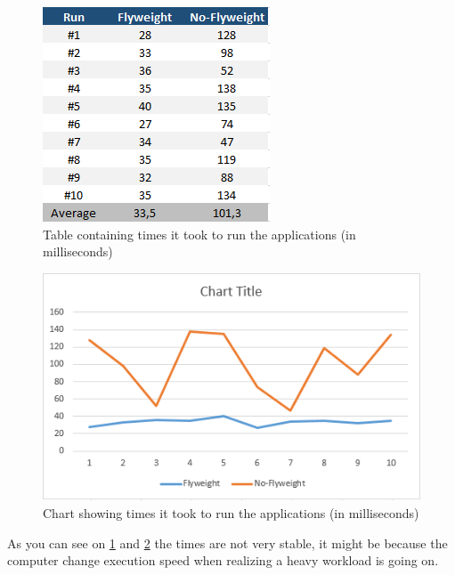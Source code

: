 \begin{figure}[h]
\centering
\includegraphics{Content/TimeTable}
\caption{Table containing times it took to run the applications (in milliseconds)}
\label{fig:TimeTable}
\end{figure}
\begin{figure}[h]
	\centering
	\includegraphics{Content/TimeChart}
	\caption{Chart showing times it took to run the applications (in milliseconds)}
	\label{fig:TimeChart}
\end{figure}
As you can see on \ref{fig:TimeTable} and \ref{fig:TimeChart} the times are not very stable, it might be because the computer change execution speed when realizing a heavy workload is going on. 